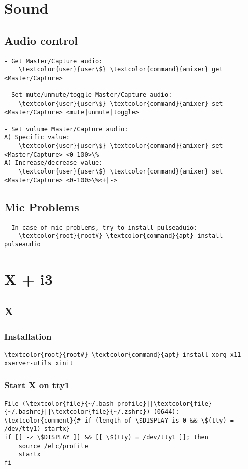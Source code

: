 \documentclass[10pt, a4paper, onecolumn, openany]{book} %
\begin{document}
\chapter{Sound}
\section{Audio control}
\begin{Verbatim}[commandchars=\\\{\}]
- Get Master/Capture audio:
    \textcolor{user}{user\$} \textcolor{command}{amixer} get <Master/Capture>

- Set mute/unmute/toggle Master/Capture audio:
    \textcolor{user}{user\$} \textcolor{command}{amixer} set <Master/Capture> <mute|unmute|toggle>

- Set volume Master/Capture audio:
A) Specific value:
    \textcolor{user}{user\$} \textcolor{command}{amixer} set <Master/Capture> <0-100>\%
A) Increase/decrease value:
    \textcolor{user}{user\$} \textcolor{command}{amixer} set <Master/Capture> <0-100>\%<+|->    
\end{Verbatim}


\section{Mic Problems}
\begin{Verbatim}[commandchars=\\\{\}]
- In case of mic problems, try to install pulseaduio:
    \textcolor{root}{root#} \textcolor{command}{apt} install pulseaudio
\end{Verbatim}

\chapter{X + i3}
\section{X}
\subsection{Installation}
\begin{Verbatim}[commandchars=\\\{\}]
    \textcolor{root}{root#} \textcolor{command}{apt} install xorg x11-xserver-utils xinit
\end{Verbatim}
\subsection{Start X on tty1}
\begin{Verbatim}[commandchars=\\\{\}]
File (\textcolor{file}{~/.bash_profile}||\textcolor{file}{~/.bashrc}||\textcolor{file}{~/.zshrc}) (0644):
\textcolor{comment}{# if (length of \$DISPLAY is 0 && \$(tty) = /dev/tty1) startx}
if [[ -z \$DISPLAY ]] && [[ \$(tty) = /dev/tty1 ]]; then
    source /etc/profile
    startx
fi
\end{Verbatim}
\end{document}
